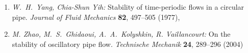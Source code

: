 \documentclass[10pt,a5paper,oneside,draft]{book}
\numberwithin{equation}{chapter}
\begin{document}
\begin{enumerate}
	\item \textsl{W.~H.~Yang, Chia-Shun Yih:} Stability of time-periodic flows in a circular pipe. \textit{Journal of Fluid Mechanics} \textbf{82}, 497--505 (1977)\bibfill\pageref{bib:yang_yih},\,\pageref{bib:yang_yih:2}
	\item \textsl{M. Zhao, M.~S.~Ghidaoui, A.~A.~Kolyshkin, R. Vaillancourt:} On the stability of oscillatory pipe flow. \textit{Technische Mechanik} \textbf{24}, 289--296 (2004)\bibfill\pageref{bib:zhao_ghidaoui}
\end{enumerate}
\end{document}

